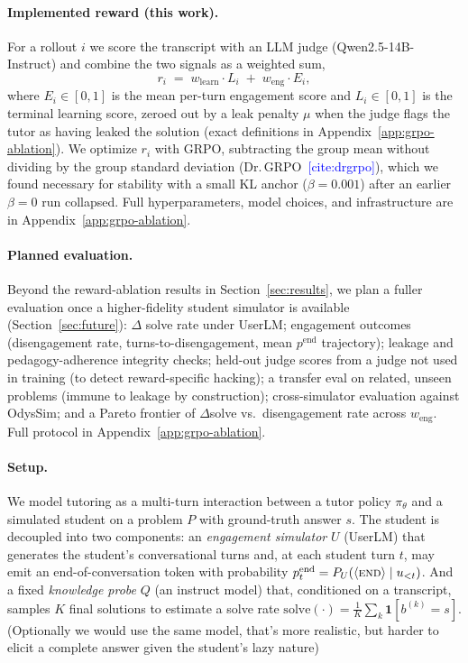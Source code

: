 \documentclass[11pt]{article}
\newcommand{\cit}[1]{\textcolor{blue}{[\textsf{cite:#1}]}}
\begin{document}
\paragraph{Implemented reward (this work).} For a rollout $i$ we score the
transcript with an LLM judge (Qwen2.5-14B-Instruct) and combine the two
signals as a weighted sum,
\begin{equation}
  r_i \;=\; w_{\text{learn}} \cdot L_i \;+\; w_{\text{eng}} \cdot E_i,
  \label{eq:weighted-reward}
\end{equation}
where $E_i \in [0,1]$ is the mean per-turn engagement score and $L_i \in
[0,1]$ is the terminal learning score, zeroed out by a leak penalty $\mu$ when
the judge flags the tutor as having leaked the solution (exact definitions in
Appendix~\ref{app:grpo-ablation}). We optimize $r_i$ with GRPO, subtracting
the group mean without dividing by the group standard deviation
(Dr.\,GRPO~\cit{drgrpo}), which we found necessary for stability with a small
KL anchor ($\beta=0.001$) after an earlier $\beta=0$ run collapsed. Full
hyperparameters, model choices, and infrastructure are in
Appendix~\ref{app:grpo-ablation}.

\paragraph{Planned evaluation.} Beyond the reward-ablation results in
Section~\ref{sec:results}, we plan a fuller evaluation once a higher-fidelity
student simulator is available (Section~\ref{sec:future}): $\Delta$ solve rate
under UserLM; engagement outcomes (disengagement rate, turns-to-disengagement,
mean $p^{\text{end}}$ trajectory); leakage and pedagogy-adherence integrity
checks; held-out judge scores from a judge not used in training (to detect
reward-specific hacking); a transfer eval on related, unseen problems (immune
to leakage by construction); cross-simulator evaluation against OdysSim; and a
Pareto frontier of $\Delta$solve vs.\ disengagement rate across
$w_{\text{eng}}$. Full protocol in Appendix~\ref{app:grpo-ablation}.

\paragraph{Setup.} We model tutoring as a multi-turn interaction between a tutor policy $\pi_\theta$ and a simulated student on a problem $P$ with ground-truth answer $s$. 
The student is decoupled into two components: an \emph{engagement simulator} $U$ (UserLM) that generates the student's conversational turns and, at each student turn $t$, may emit an end-of-conversation token with probability $p^{\text{end}}_t = P_U( \langle \textsc{end} \rangle \mid u_{<t})$. 
And a fixed \emph{knowledge probe} $Q$ (an instruct model) that, conditioned on a transcript, samples $K$ final
solutions to estimate a solve rate $\mathrm{solve}(\cdot) = \frac{1}{K}\sum_k
\mathbf{1}[b^{(k)} = s]$. 
(Optionally we would use the same model, that's more realistic, but harder to elicit a complete answer given the student's lazy nature)
\end{document}
